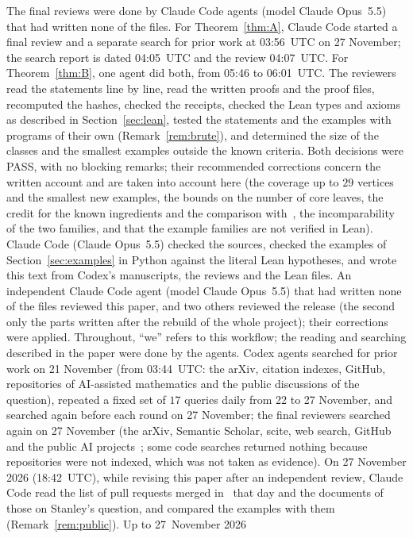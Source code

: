 \documentclass[11pt]{article}
\theoremstyle{definition}
\theoremstyle{remark}
\begin{document}
The final reviews were done by Claude Code agents (model Claude Opus~5.5) that
had written none of the files. For Theorem~\ref{thm:A}, Claude Code started a
final review and a separate search for prior work at 03:56~UTC on 27 November;
the search report is dated 04:05~UTC and the review 04:07~UTC. For
Theorem~\ref{thm:B}, one agent did both, from 05:46 to 06:01~UTC. The reviewers
read the statements line by line, read the written proofs and the proof files,
recomputed the hashes, checked the receipts, checked the Lean types and axioms as
described in Section~\ref{sec:lean}, tested the statements and the examples with
programs of their own (Remark~\ref{rem:brute}), and determined the size of the
classes and the smallest examples outside the known criteria. Both decisions were
PASS, with no blocking remarks; their recommended corrections concern the written
account and are taken into account here (the coverage up to $29$ vertices and the
smallest new examples, the bounds on the number of core leaves, the credit for
the known ingredients and the comparison with~\cite{zeng,awan,got}, the
incomparability of the two families, and that the example families are not
verified in Lean). Claude Code (Claude Opus~5.5) checked the sources, checked
the examples of Section~\ref{sec:examples} in Python against the literal Lean
hypotheses, and wrote this text from Codex's manuscripts, the reviews and the
Lean files. An independent Claude Code agent (model Claude Opus~5.5) that had written none
of the files reviewed this paper, and two others reviewed the release (the second
only the parts written after the rebuild of the whole project); their corrections
were applied. Throughout, ``we'' refers to this workflow; the reading
and searching described in the paper were done by the agents. Codex agents
searched for prior work on 21 November (from 03:44~UTC: the arXiv, citation
indexes, GitHub, repositories of AI-assisted mathematics and the public
discussions of the question), repeated a fixed set of $17$ queries daily from 22
to 27 November, and searched again before each round on 27 November; the final
reviewers searched again on 27 November (the arXiv, Semantic Scholar, scite, web
search, GitHub and the public AI projects~\cite{aur,sc}; some code searches
returned nothing because repositories were not indexed, which was not taken as
evidence). On 27 November 2026 (18:42~UTC), while revising this paper after an
independent review, Claude Code read the list of pull requests merged
in~\cite{sc} that day and the documents of those on Stanley's question, and
compared the examples with them (Remark~\ref{rem:public}). Up to 27~November 2026
\end{document}
